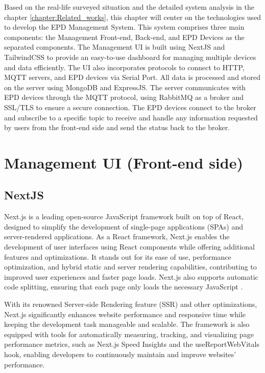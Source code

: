 \documentclass[../Main.tex]{subfiles}
\begin{document}
Based on the real-life surveyed situation and the detailed system analysis in the chapter \ref{chapter:Related_works}, this chapter will center on the technologies used to develop the \gls{EPD}  Management System. This system comprises three main components: the Management Front-end, Back-end, and \gls{EPD} Devices as the separated components. The Management UI is built using NextJS and TailwindCSS to provide an easy-to-use dashboard for managing multiple devices and data efficiently. The UI also incorporates protocols to connect to HTTP, MQTT servers, and \gls{EPD} devices via Serial Port. All data is processed and stored on the server using MongoDB and ExpressJS. The server communicates with \gls{EPD} devices through the MQTT protocol, using RabbitMQ as a broker and SSL/TLS to ensure a secure connection. The \gls{EPD} devices connect to the broker and subscribe to a specific topic to receive and handle any information requested by users from the front-end side and send the status back to the broker.

\section{Management UI (Front-end side)}
\subsection{NextJS}
Next.js is a leading open-source JavaScript framework built on top of React, designed to simplify the development of single-page applications (SPAs) and server-rendered applications\cite{nextjs}. As a React framework, Next.js enables the development of user interfaces using React components while offering additional features and optimizations. It stands out for its ease of use, performance optimization, and hybrid static and server rendering capabilities, contributing to improved user experiences and faster page loads. Next.js also supports automatic code splitting, ensuring that each page only loads the necessary JavaScript \cite{nextjs-1}.

With its renowned Server-side Rendering feature (SSR) and other optimizations, Next.js significantly enhances website performance and responsive time while keeping the development task manageable and scalable. The framework is also equipped with tools for automatically measuring, tracking, and visualizing page performance metrics, such as Next.js Speed Insights and the useReportWebVitals hook, enabling developers to continuously maintain and improve websites' performance\cite{nextjs-2}. 
\end{document}
